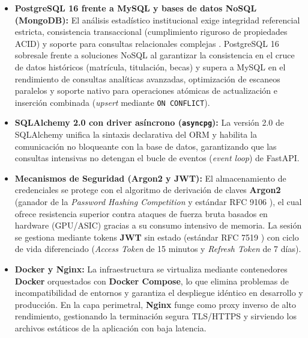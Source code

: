 \begin{itemize}
    \item \textbf{PostgreSQL 16 frente a MySQL y bases de datos NoSQL (MongoDB):} El análisis estadístico institucional exige integridad referencial estricta, consistencia transaccional (cumplimiento riguroso de propiedades ACID) y soporte para consultas relacionales complejas \cite{kleppmann2017}. PostgreSQL 16 \cite{postgresql2024} sobresale frente a soluciones NoSQL al garantizar la consistencia en el cruce de datos históricos (matrícula, titulación, becas) y supera a MySQL en el rendimiento de consultas analíticas avanzadas, optimización de escaneos paralelos y soporte nativo para operaciones atómicas de actualización e inserción combinada (\textit{upsert} mediante \texttt{ON CONFLICT}).
    \item \textbf{SQLAlchemy 2.0 con driver asíncrono (\texttt{asyncpg}):} La versión 2.0 de SQLAlchemy \cite{bayer2024} unifica la sintaxis declarativa del ORM y habilita la comunicación no bloqueante con la base de datos, garantizando que las consultas intensivas no detengan el bucle de eventos (\textit{event loop}) de FastAPI.
    \item \textbf{Mecanismos de Seguridad (Argon2 y JWT):} El almacenamiento de credenciales se protege con el algoritmo de derivación de claves \textbf{Argon2} (ganador de la \textit{Password Hashing Competition} y estándar RFC 9106 \cite{rfc9106}), el cual ofrece resistencia superior contra ataques de fuerza bruta basados en hardware (GPU/ASIC) gracias a su consumo intensivo de memoria. La sesión se gestiona mediante tokens \textbf{JWT} sin estado (estándar RFC 7519 \cite{rfc7519}) con ciclo de vida diferenciado (\textit{Access Token} de 15 minutos y \textit{Refresh Token} de 7 días).
    \item \textbf{Docker y Nginx:} La infraestructura se virtualiza mediante contenedores \textbf{Docker} \cite{merkel2014} orquestados con \textbf{Docker Compose}, lo que elimina problemas de incompatibilidad de entornos y garantiza el despliegue idéntico en desarrollo y producción. En la capa perimetral, \textbf{Nginx} \cite{reese2008} funge como proxy inverso de alto rendimiento, gestionando la terminación segura TLS/HTTPS y sirviendo los archivos estáticos de la aplicación con baja latencia.
\end{itemize}

